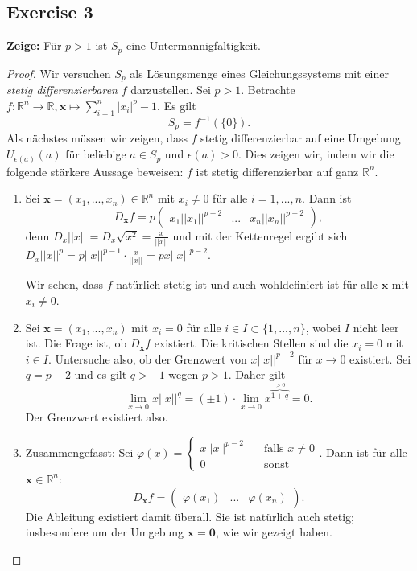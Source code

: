 \documentclass[a4paper]{article}
\renewcommand{\hline}{\noindent\makebox[\linewidth]{\rule{12cm}{1pt}}}
\begin{document}
\subsection*{Exercise 3}

\textbf{Zeige:} Für $p > 1$ ist $S_p$ eine Untermannigfaltigkeit.
\begin{proof}
Wir versuchen $S_p$ als Lösungsmenge eines Gleichungssystems mit einer \textit{stetig differenzierbaren} $f$ darzustellen. Sei $p > 1$. Betrachte $f: \mathbb R^n \to \mathbb R, \mathbf x \mapsto \sum^n_{i = 1} |x_i|^p - 1$. Es gilt
\[
	S_p = f^{-1}{(\{0\})}.
\]
Als nächstes müssen wir zeigen, dass $f$ stetig differenzierbar auf eine Umgebung $U_{\epsilon(a)}(a)$ für beliebige $a \in S_p$ und $\epsilon(a) > 0$. Dies zeigen wir, indem wir die folgende stärkere Aussage beweisen: $f$ ist stetig differenzierbar auf ganz $\mathbb R^n$. 
\hline

\begin{enumerate}
\item Sei $\mathbf x = (x_1,...,x_n) \in \mathbb R^n$ mit $x_i \neq 0$ für alle $i = 1,...,n$. Dann ist
\[
	D_{\mathbf x}f = p \begin{pmatrix}
		x_1 ||x_1||^{p - 2} & ... & x_n ||x_n||^{p-2}
	\end{pmatrix},
\]
denn $D_x ||x|| = D_x \sqrt{x^2} = \frac{x}{||x||}$ und mit der Kettenregel ergibt sich $D_x||x||^p = p || x ||^{p-1} \cdot \frac{x}{||x||} = px||x||^{p-2}$. 

Wir sehen, dass $f$ natürlich stetig ist und auch wohldefiniert ist für alle $\mathbf x$ mit $x_i \neq 0$.

\item Sei $\mathbf x = (x_1,...,x_n)$ mit $x_i = 0$ für alle $i \in I \subset \{ 1,..., n \}$, wobei $I$ nicht leer ist. Die Frage ist, ob $D_\mathbf{x}f$ existiert. Die kritischen Stellen sind die $x_i = 0$ mit $i \in I$. Untersuche also, ob der Grenzwert von $x||x||^{p-2}$ für $x \to 0$ existiert. Sei $q = p-2$ und es gilt $q > -1$ wegen $p > 1$. Daher gilt
\[
	\lim_{x \to 0} x||x||^q = (\pm 1) \cdot \lim_{x \to 0}x^{\overbrace{1+q}^{>0}} = 0.
\]
Der Grenzwert existiert also.

\item Zusammengefasst: Sei $\varphi(x) = \begin{cases}
	x||x||^{p-2} \quad & \text{falls } x \neq 0 \\
	0 & \text{sonst}
\end{cases}$. Dann ist für alle $\mathbf x \in \mathbb R^n$:
\[
	D_\mathbf{x}f = \begin{pmatrix}
		\varphi(x_1) & ... & \varphi(x_n)
	\end{pmatrix}.
\]
Die Ableitung existiert damit überall. Sie ist natürlich auch stetig; insbesondere um der Umgebung $\mathbf x = \mathbf 0$, wie wir gezeigt haben.
\end{enumerate}


\end{proof}
\end{document}
